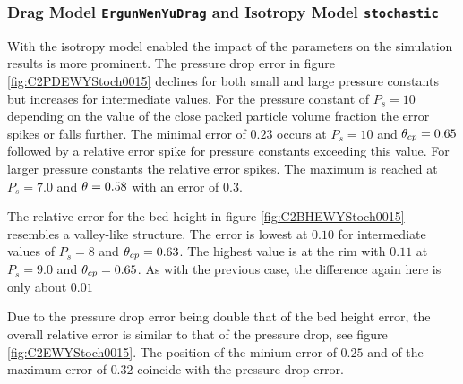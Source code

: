 


\subsubsection{Drag Model \lstinline|ErgunWenYuDrag| and Isotropy Model \lstinline|stochastic|}
With the isotropy model enabled the impact of the parameters on the simulation results is more prominent.
The pressure drop error in figure \ref{fig:C2PDEWYStoch0015} declines for both small and large pressure constants but increases for intermediate values.
For the pressure constant of $P_s = 10$ depending on the value of the close packed particle volume fraction the error spikes or falls further. The minimal error of $0.23$ occurs at $P_s = 10$ and $\theta_{cp} = 0.65$ followed by a relative error spike for pressure constants exceeding this value. For larger pressure constants the relative error spikes.
The maximum is reached at $P_s = 7.0$ and $\theta = 0.58$ with an error of $0.3$.

The relative error for the bed height in figure \ref{fig:C2BHEWYStoch0015} resembles a valley-like structure. The error is lowest at $0.10$ for intermediate values of $P_s=8$ and $\theta_{cp} = 0.63$. The highest value is at the rim with $0.11$ at $P_s = 9.0$ and $\theta_{cp} = 0.65$.
As with the previous case, the difference again here is only about $0.01$

Due to the pressure drop error being double that of the bed height error, the overall relative error is similar to that of the pressure drop, see figure \ref{fig:C2EWYStoch0015}.
The position of the minium error of $0.25$ and of the maximum error of $0.32$ coincide with the pressure drop error.


